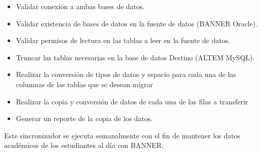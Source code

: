 \begin{itemize}
    \item Validar conexión a ambas bases de datos.
    \item Validar existencia de bases de datos en la fuente de datos (BANNER Oracle).
    \item Validar permisos de lectura en las tablas a leer en la fuente de datos.
    \item Truncar las tablas necesarias en la base de datos Destino (ALTEM MySQL).
    \item Realizar la conversión de tipos de datos y espacio para cada una de las columnas de las tablas que se desean migrar
    \item Realizar la copia y conversión de datos de cada una de las filas a transferir
    \item Generar un reporte de la copia de los datos.
\end{itemize}

Este sincronizador se ejecuta semanalmente con el fin de mantener los datos académicos de los estudiantes al día con BANNER.